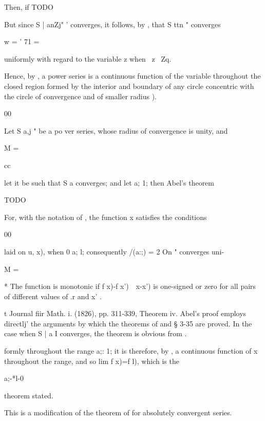 Then, if
TODO

But since S | anZj" ' converges, it follows, by , that S ttn "
converges

w = ' 71 =

uniformly with regard to the variable z when \ z \ Zq.

Hence, by , a power series is a continuous function of the
variable throughout the closed region formed by the interior and
boundary of any circle concentric with the circle of convergence and
of smaller radius ).


00

Let S a,j " be a po ver series, whose radius of convergence is unity,
and

M =

cc

let it be such that S a converges; and let a; 1; then Abel's theorem

TODO

For, with the notation of , the function x satisfies the
conditions

00

laid on u, x), when 0 a; l; consequently /(a:;) = 2 On " converges
uni-

M =

* The function is monotonic if f x)-f x')\ \ x-x') is one-signed or
zero for all pairs of different values of .r and x' .

t Journal fiir Math. i. (1826), pp. 311-339, Theorem iv. Abel's proof
employs directlj' the arguments by which the theorems of  and §
3-35 are proved. In the case when S | a I converges, the theorem is
obvious from .

%
%

formly throughout the range a;: 1; it is therefore, by , a
continuous function of x throughout the range, and so lim f x)=f l),
which is the

a;-*l-0

theorem stated.


This is a modification of the theorem of  for absolutely
convergent series.


